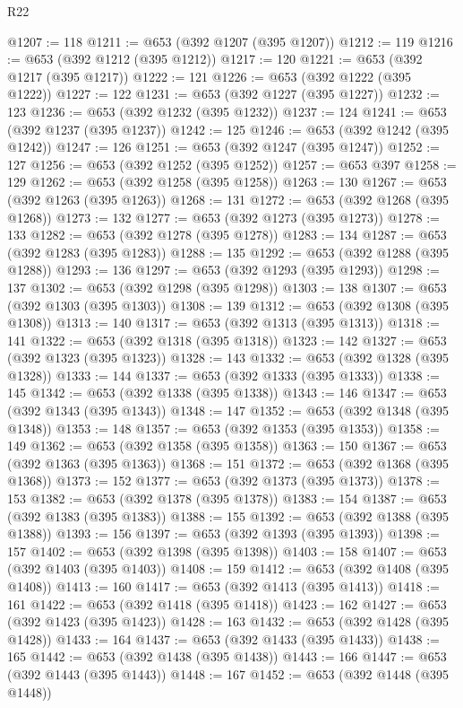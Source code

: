 \begin{lexlean}{R22}
\begin{coremodule}
@1207 := 118
@1211 := @653 (@392 @1207 (@395 @1207))
@1212 := 119
@1216 := @653 (@392 @1212 (@395 @1212))
@1217 := 120
@1221 := @653 (@392 @1217 (@395 @1217))
@1222 := 121
@1226 := @653 (@392 @1222 (@395 @1222))
@1227 := 122
@1231 := @653 (@392 @1227 (@395 @1227))
@1232 := 123
@1236 := @653 (@392 @1232 (@395 @1232))
@1237 := 124
@1241 := @653 (@392 @1237 (@395 @1237))
@1242 := 125
@1246 := @653 (@392 @1242 (@395 @1242))
@1247 := 126
@1251 := @653 (@392 @1247 (@395 @1247))
@1252 := 127
@1256 := @653 (@392 @1252 (@395 @1252))
@1257 := @653 @397
@1258 := 129
@1262 := @653 (@392 @1258 (@395 @1258))
@1263 := 130
@1267 := @653 (@392 @1263 (@395 @1263))
@1268 := 131
@1272 := @653 (@392 @1268 (@395 @1268))
@1273 := 132
@1277 := @653 (@392 @1273 (@395 @1273))
@1278 := 133
@1282 := @653 (@392 @1278 (@395 @1278))
@1283 := 134
@1287 := @653 (@392 @1283 (@395 @1283))
@1288 := 135
@1292 := @653 (@392 @1288 (@395 @1288))
@1293 := 136
@1297 := @653 (@392 @1293 (@395 @1293))
@1298 := 137
@1302 := @653 (@392 @1298 (@395 @1298))
@1303 := 138
@1307 := @653 (@392 @1303 (@395 @1303))
@1308 := 139
@1312 := @653 (@392 @1308 (@395 @1308))
@1313 := 140
@1317 := @653 (@392 @1313 (@395 @1313))
@1318 := 141
@1322 := @653 (@392 @1318 (@395 @1318))
@1323 := 142
@1327 := @653 (@392 @1323 (@395 @1323))
@1328 := 143
@1332 := @653 (@392 @1328 (@395 @1328))
@1333 := 144
@1337 := @653 (@392 @1333 (@395 @1333))
@1338 := 145
@1342 := @653 (@392 @1338 (@395 @1338))
@1343 := 146
@1347 := @653 (@392 @1343 (@395 @1343))
@1348 := 147
@1352 := @653 (@392 @1348 (@395 @1348))
@1353 := 148
@1357 := @653 (@392 @1353 (@395 @1353))
@1358 := 149
@1362 := @653 (@392 @1358 (@395 @1358))
@1363 := 150
@1367 := @653 (@392 @1363 (@395 @1363))
@1368 := 151
@1372 := @653 (@392 @1368 (@395 @1368))
@1373 := 152
@1377 := @653 (@392 @1373 (@395 @1373))
@1378 := 153
@1382 := @653 (@392 @1378 (@395 @1378))
@1383 := 154
@1387 := @653 (@392 @1383 (@395 @1383))
@1388 := 155
@1392 := @653 (@392 @1388 (@395 @1388))
@1393 := 156
@1397 := @653 (@392 @1393 (@395 @1393))
@1398 := 157
@1402 := @653 (@392 @1398 (@395 @1398))
@1403 := 158
@1407 := @653 (@392 @1403 (@395 @1403))
@1408 := 159
@1412 := @653 (@392 @1408 (@395 @1408))
@1413 := 160
@1417 := @653 (@392 @1413 (@395 @1413))
@1418 := 161
@1422 := @653 (@392 @1418 (@395 @1418))
@1423 := 162
@1427 := @653 (@392 @1423 (@395 @1423))
@1428 := 163
@1432 := @653 (@392 @1428 (@395 @1428))
@1433 := 164
@1437 := @653 (@392 @1433 (@395 @1433))
@1438 := 165
@1442 := @653 (@392 @1438 (@395 @1438))
@1443 := 166
@1447 := @653 (@392 @1443 (@395 @1443))
@1448 := 167
@1452 := @653 (@392 @1448 (@395 @1448))

\end{coremodule}
\end{lexlean}
